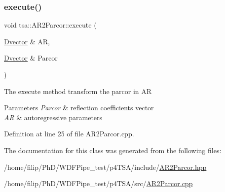\subsubsection{\texorpdfstring{execute()}{execute()}}
{\footnotesize\ttfamily void tsa\+::\+A\+R2\+Parcor\+::execute (\begin{DoxyParamCaption}\item[{\hyperlink{namespacetsa_a8900fb03d849baf447a1a0efe2561fb2}{Dvector} \&}]{AR,  }\item[{\hyperlink{namespacetsa_a8900fb03d849baf447a1a0efe2561fb2}{Dvector} \&}]{Parcor }\end{DoxyParamCaption})}

The execute method transform the parcor in AR


\begin{DoxyParams}{Parameters}
{\em Parcor} & reflection coefficients vector \\
\hline
{\em AR} & autoregressive parameters \\
\hline
\end{DoxyParams}


Definition at line 25 of file A\+R2\+Parcor.\+cpp.



The documentation for this class was generated from the following files\+:\begin{DoxyCompactItemize}
\item 
/home/filip/\+Ph\+D/\+W\+D\+F\+Pipe\+\_\+test/p4\+T\+S\+A/include/\hyperlink{_a_r2_parcor_8hpp}{A\+R2\+Parcor.\+hpp}\item 
/home/filip/\+Ph\+D/\+W\+D\+F\+Pipe\+\_\+test/p4\+T\+S\+A/src/\hyperlink{_a_r2_parcor_8cpp}{A\+R2\+Parcor.\+cpp}\end{DoxyCompactItemize}
